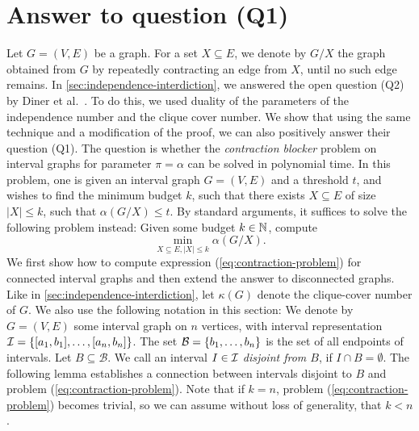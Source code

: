  

\section{Answer to question (Q1)}
\label{app:contraction}

Let $G = (V, E)$ be a graph. For a set $X \subseteq E$, we denote by $G/X$ the graph obtained from $G$ by repeatedly contracting an edge from $X$, until no such edge remains. In \cref{sec:independence-interdiction}, we answered the open question (Q2) by Diner et al.\ \cite{diner2018contractionDeletionBlockers}. To do this, we used duality of the parameters of the independence number and the clique cover number. We show that using the same technique and a modification of the proof, we can also positively answer their question (Q1). The question is whether the \emph{contraction blocker} problem on interval graphs for parameter $\pi = \alpha$ can be solved in polynomial time. In this problem, one is given an interval graph $G = (V, E)$ and a threshold $t$, and wishes to find the minimum budget $k$, such that there exists $X \subseteq E$ of size $|X| \leq k$, such that $\alpha(G/X) \leq t$. By standard arguments, it suffices to solve the following problem instead: Given some budget $k \in \mathbb{N}$, compute
\begin{equation}
\min_{X \subseteq E, |X| \leq k}\alpha(G/X). \label{eq:contraction-problem}
\end{equation}  
We first show how to compute expression (\ref{eq:contraction-problem}) for connected interval graphs and then extend the answer to disconnected graphs. Like in \cref{sec:independence-interdiction}, let $\kappa(G)$ denote the clique-cover number of $G$. We also use the following notation in this section: We denote by $G = (V, E)$ some interval graph on $n$ vertices, with interval representation $\mathcal{I} = \{ [a_1, b_1], \ldots, [a_n, b_n] \}$. The set $\mathcal{B} =  \{ b_1, \ldots, b_n \}$ is the set of all endpoints of intervals. Let $B \subseteq \mathcal{B}$. We call an interval $I \in \mathcal{I}$ \emph{disjoint from $B$}, if $I \cap B = \emptyset$. The following lemma establishes a connection between intervals disjoint to $B$ and problem (\ref{eq:contraction-problem}). Note that if $k = n$,  problem (\ref{eq:contraction-problem}) becomes trivial, so we can assume without loss of generality, that $k < n$.

